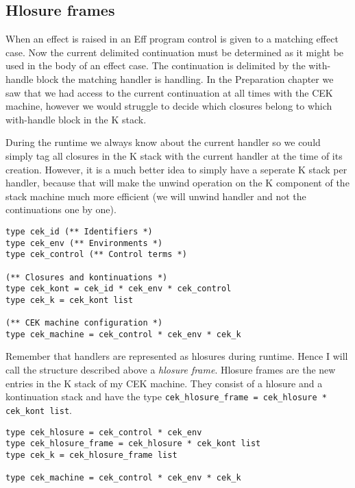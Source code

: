 \documentclass[class=article, crop=false]{standalone}
\begin{document}
\subsection{Hlosure frames}

When an effect is raised in an Eff program control is given to a matching effect case.
Now the current delimited continuation must be determined as it might be used in the body
of an effect case. The continuation is delimited by the with-handle block the matching
handler is handling. In the Preparation chapter we saw that we had access to the current
continuation at all times with the CEK machine, however we would struggle to decide which
closures belong to which with-handle block in the K stack.

During the runtime we always know about the current handler so we could simply tag all
closures in the K stack with the current handler at the time of its creation. However,
it is a much better idea to simply have a seperate K stack per handler, because
that will make the unwind operation on the K component of the stack machine much more efficient
(we will unwind handler and not the continuations one by one).

\noindent
\begin{minipage}{\textwidth}
\begin{center}
\begin{lstlisting}[language=caml]
type cek_id (** Identifiers *)
type cek_env (** Environments *)
type cek_control (** Control terms *)

(** Closures and kontinuations *)
type cek_kont = cek_id * cek_env * cek_control
type cek_k = cek_kont list

(** CEK machine configuration *)
type cek_machine = cek_control * cek_env * cek_k
\end{lstlisting}
\end{center}
\end{minipage}

Remember that handlers are represented as hlosures during runtime. Hence I will call the
structure described above a \emph{hlosure frame}. Hlosure frames are the new entries in
the K stack of my CEK machine. They consist of a hlosure and a kontinuation stack and
have the type \verb|cek_hlosure_frame = cek_hlosure * cek_kont list|.

\begin{lstlisting}[language=caml]
type cek_hlosure = cek_control * cek_env
type cek_hlosure_frame = cek_hlosure * cek_kont list
type cek_k = cek_hlosure_frame list

type cek_machine = cek_control * cek_env * cek_k
\end{lstlisting}
\end{document}

